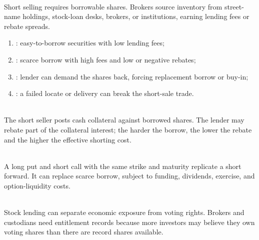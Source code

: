 \documentclass[a4paper,oneside,openany]{book}
\begin{document}
\begin{mechanism} \\
Short selling requires borrowable shares. Brokers source inventory from street-name holdings, stock-loan desks, brokers, or institutions, earning lending fees or rebate spreads.
\end{mechanism}

\begin{taxonomy} 
\begin{enumerate}[label=\roman*.]
\setlength{\itemsep}{0pt}
\item {}: easy-to-borrow securities with low lending fees;
\item {}: scarce borrow with high fees and low or negative rebates;
\item {}: lender can demand the shares back, forcing replacement borrow or buy-in;
\item {}: a failed locate or delivery can break the short-sale trade.
\end{enumerate}
\end{taxonomy}

\begin{definition} \\
The short seller posts cash collateral against borrowed shares. The lender may rebate part of the collateral interest; the harder the borrow, the lower the rebate and the higher the effective shorting cost.
\end{definition}

\begin{principle} \\
A long put and short call with the same strike and maturity replicate a short forward. It can replace scarce borrow, subject to funding, dividends, exercise, and option-liquidity costs.
\end{principle}

\begin{caveat} \\
Stock lending can separate economic exposure from voting rights. Brokers and custodians need entitlement records because more investors may believe they own voting shares than there are record shares available.
\end{caveat}
\end{document}

